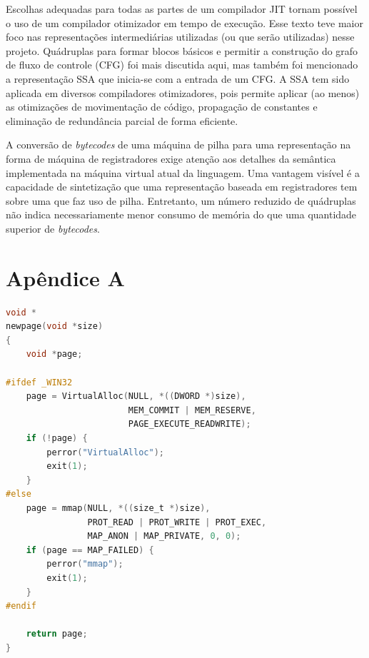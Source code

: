 Escolhas adequadas para todas as partes de um compilador JIT tornam
possível o uso de um compilador otimizador em tempo de execução. Esse
texto teve maior foco nas representações intermediárias utilizadas (ou
que serão utilizadas) nesse projeto. Quádruplas para formar blocos
básicos e permitir a construção do grafo de fluxo de controle (CFG)
foi mais discutida aqui, mas também foi mencionado a representação SSA
que inicia-se com a entrada de um CFG. A SSA tem sido aplicada em
diversos compiladores otimizadores, pois permite aplicar (ao menos)
as otimizações de movimentação de código, propagação de constantes e
eliminação de redundância parcial de forma eficiente.

A conversão de \textit{bytecodes} de uma máquina de pilha para uma
representação na forma de máquina de registradores exige atenção aos
detalhes da semântica implementada na máquina virtual atual da
linguagem. Uma vantagem visível é a capacidade de sintetização que
uma representação baseada em registradores tem sobre uma que faz uso
de pilha. Entretanto, um número reduzido de quádruplas não indica
necessariamente menor consumo de memória do que uma quantidade
superior de \textit{bytecodes}.





\section*{Apêndice A}

\renewcommand\lstlistingname{Código}

\begin{lstlisting}[language=C, caption={Alocação de página(s) para o
    compilador JIT}, frame=tb]
void *
newpage(void *size)
{
    void *page;

#ifdef _WIN32
    page = VirtualAlloc(NULL, *((DWORD *)size),
                        MEM_COMMIT | MEM_RESERVE,
                        PAGE_EXECUTE_READWRITE);
    if (!page) {
        perror("VirtualAlloc");
        exit(1);
    }
#else
    page = mmap(NULL, *((size_t *)size),
                PROT_READ | PROT_WRITE | PROT_EXEC,
                MAP_ANON | MAP_PRIVATE, 0, 0);
    if (page == MAP_FAILED) {
        perror("mmap");
        exit(1);
    }
#endif

    return page;
}
\end{lstlisting}


